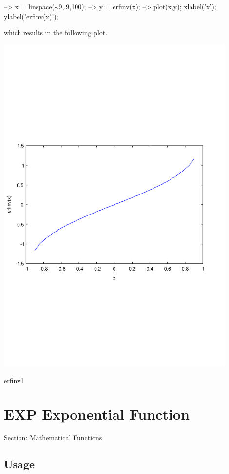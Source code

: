 \begin{DoxyVerbInclude}
--> x = linspace(-.9,.9,100);
--> y = erfinv(x);
--> plot(x,y); xlabel('x'); ylabel('erfinv(x)');
\end{DoxyVerbInclude}


which results in the following plot.  
\begin{DoxyImage}
\includegraphics[width=12cm]{erfinv1}
\caption{erfinv1}
\end{DoxyImage}
 \hypertarget{mathfunctions_exp}{}\section{E\-X\-P Exponential Function}\label{mathfunctions_exp}
Section\-: \hyperlink{sec_mathfunctions}{Mathematical Functions} \hypertarget{vtkwidgets_vtkxyplotwidget_Usage}{}\subsection{Usage}\label{vtkwidgets_vtkxyplotwidget_Usage}
